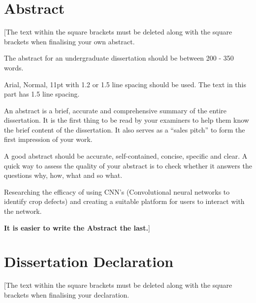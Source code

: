 \titleformat{\chapter}[hang]
    {\normalfont\Huge\bfseries}{\chaptertitlename\ \thechapter\ -\ }{0pt}{\Huge}
\titlespacing*{\chapter}{0pt}{0pt}{20pt}



\chapter*{Abstract}
\thispagestyle{fancy} %

[The text within the square brackets must be deleted along with the square brackets when finalising your own abstract.

The abstract for an undergraduate dissertation should be between 200 - 350 words.

Arial, Normal, 11pt with 1.2 or 1.5 line spacing should be used. The text in this part has 1.5 line spacing.

An abstract is a brief, accurate and comprehensive summary of the entire dissertation. It is the first thing to be read by your examiners to help them know the brief content of the dissertation. It also serves as a “sales pitch” to form the first impression of your work.

A good abstract should be accurate, self-contained, concise, specific and clear. A quick way to assess the quality of your abstract is to check whether it answers the questions why, how, what and so what.

Researching the efficacy of using CNN's (Convolutional neural networks to identify crop defects) and creating a suitable platform for users to interact with the network.

\textbf{It is easier to write the Abstract the last.}]





\chapter*{Dissertation Declaration}
\thispagestyle{fancy} %

\color{red}
[The text within the square brackets must be deleted along with the square brackets when finalising your declaration.

